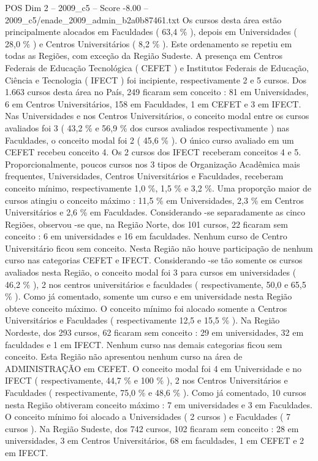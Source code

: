 \begin{textsample}{POS Dim 2 – 2009\_c5 – Score -8.00 – 2009\_c5/enade\_2009\_admin\_b2a0b87461.txt}
Os cursos desta área estão principalmente alocados em Faculdades ( 63,4 \% ), depois em Universidades ( 28,0 \% ) e Centros Universitários ( 8,2 \% ).
Este ordenamento se repetiu em todas as Regiões, com exceção da Região Sudeste.
A presença em Centros Federais de Educação Tecnológica ( CEFET ) e Institutos Federais de Educação, Ciência e Tecnologia ( IFECT ) foi incipiente, respectivamente 2 e 5 cursos.
Dos 1.663 cursos desta área no País, 249 ficaram sem conceito : 81 em Universidades, 6 em Centros Universitários, 158 em Faculdades, 1 em CEFET e 3 em IFECT.
Nas Universidades e nos Centros Universitários, o conceito modal entre os cursos avaliados foi 3 ( 43,2 \% e 56,9 \% dos cursos avaliados respectivamente ) nas Faculdades, o conceito modal foi 2 ( 45,6 \% ).
O único curso avaliado em um CEFET recebeu conceito 4.
Os 2 cursos dos IFECT receberam conceitos 4 e 5.
Proporcionalmente, poucos cursos nos 3 tipos de Organização Acadêmica mais frequentes, Universidades, Centros Universitários e Faculdades, receberam conceito mínimo, respectivamente 1,0 \%, 1,5 \% e 3,2 \%.
Uma proporção maior de cursos atingiu o conceito máximo : 11,5 \% em Universidades, 2,3 \% em Centros Universitários e 2,6 \% em Faculdades.
Considerando -se separadamente as cinco Regiões, observou -se que, na Região Norte, dos 101 cursos, 22 ficaram sem conceito : 6 em universidades e 16 em faculdades.
Nenhum curso de Centro Universitário ficou sem conceito.
Nesta Região não houve participação de nenhum curso nas categorias CEFET e IFECT.
Considerando -se tão somente os cursos avaliados nesta Região, o conceito modal foi 3 para cursos em universidades ( 46,2 \% ), 2 nos centros universitários e faculdades ( respectivamente, 50,0 e 65,5 \% ).
Como já comentado, somente um curso e em universidade nesta Região obteve conceito máximo.
O conceito mínimo foi alocado somente a Centros Universitários e Faculdades ( respectivamente 12,5 e 15,5 \% ).
Na Região Nordeste, dos 293 cursos, 62 ficaram sem conceito : 29 em universidades, 32 em faculdades e 1 em IFECT.
Nenhum curso nas demais categorias ficou sem conceito.
Esta Região não apresentou nenhum curso na área de ADMINISTRAÇÃO em CEFET.
O conceito modal foi 4 em Universidade e no IFECT ( respectivamente, 44,7 \% e 100 \% ), 2 nos Centros Universitários e Faculdades ( respectivamente, 75,0 \% e 48,6 \% ).
Como já comentado, 10 cursos nesta Região obtiveram conceito máximo : 7 em universidades e 3 em Faculdades.
O conceito mínimo foi alocado a Universidades ( 2 cursos ) e Faculdades ( 7 cursos ).
Na Região Sudeste, dos 742 cursos, 102 ficaram sem conceito : 28 em universidades, 3 em Centros Universitários, 68 em faculdades, 1 em CEFET e 2 em IFECT.

\end{textsample}

